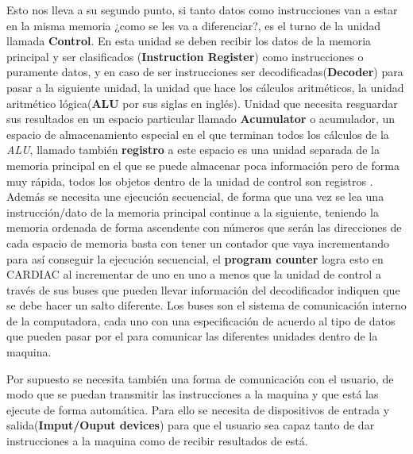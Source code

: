 \documentclass[letterpaper,12pt,oneside]{book}
\begin{document}
		Esto nos lleva a su segundo punto, si tanto datos como instrucciones van a estar en la misma memoria ¿como se les va a diferenciar?, es el turno
		de la unidad llamada \textbf{Control}. En esta unidad se deben recibir los datos de la memoria principal y ser 
		clasificados (\textbf{Instruction Register})
		como instrucciones o puramente datos, y en caso de ser instrucciones ser decodificadas(\textbf{Decoder}) para pasar a la siguiente  unidad, la 
		unidad
		que hace los cálculos aritméticos, la unidad aritmético lógica(\textbf{ALU} por sus siglas en inglés). Unidad que necesita resguardar sus 
		resultados en un espacio particular llamado \textbf{Acumulator} o acumulador, un espacio de almacenamiento especial en el que terminan todos los 
		cálculos
		de la \textit{ALU}, llamado también \textbf{registro} a este espacio es una unidad separada de la memoria principal en el que se puede almacenar 
		poca información pero de forma muy rápida, todos los objetos dentro de la unidad de control son registros
 		. Además se necesita une ejecución secuencial, de forma que una vez se lea una instrucción/dato de la memoria principal continue a la 
		siguiente, teniendo la memoria ordenada de forma ascendente con números que serán las direcciones de cada espacio de memoria basta con tener un 
		contador
		que vaya incrementando para así conseguir la ejecución secuencial, el \textbf{program counter} logra esto en CARDIAC al incrementar de uno
		en uno a menos que la unidad de control a través de sus buses que pueden llevar información del decodificador indiquen que se debe hacer
		un salto diferente. Los buses son el sistema de comunicación interno de la computadora, cada uno con una especificación de acuerdo al tipo
		de datos que pueden pasar por el para comunicar las diferentes unidades dentro de la maquina\cite{von_neumann_papers_1987}.
		
		Por supuesto se necesita también una forma de comunicación con el usuario, de modo que se puedan transmitir las instrucciones a la maquina
		y que está las ejecute de forma automática. Para ello se necesita de dispositivos de entrada y salida(\textbf{Imput/Ouput devices}) para que
		el usuario sea capaz tanto de dar instrucciones a la maquina como de recibir resultados de está\cite{von_neumann_papers_1987}.
		
\end{document}
